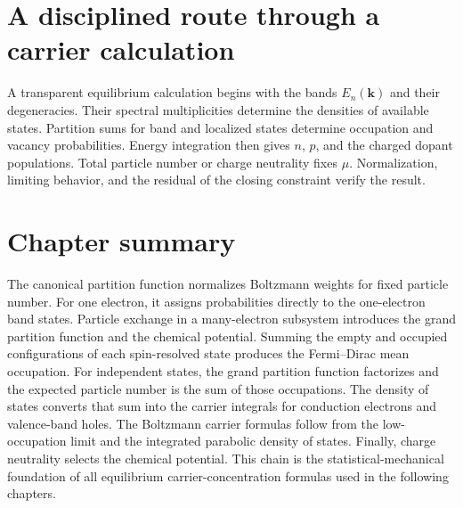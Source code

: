 \section{A disciplined route through a carrier calculation}

A transparent equilibrium calculation begins with the bands
$E_n(\bm k)$ and their degeneracies.  Their spectral multiplicities determine
the densities of available states.  Partition sums for band and localized
states determine occupation and vacancy probabilities.  Energy integration
then gives $n$, $p$, and the charged dopant populations.  Total particle number
or charge neutrality fixes $\mu$.  Normalization, limiting behavior, and the
residual of the closing constraint verify the result.

\section{Chapter summary}

The canonical partition function normalizes Boltzmann weights for fixed particle
number.  For one electron, it assigns probabilities directly to the
one-electron band states.  Particle exchange in a many-electron subsystem
introduces the grand partition
function and the chemical potential.  Summing the empty and occupied
configurations of each spin-resolved state produces the Fermi--Dirac mean
occupation.  For independent states,
the grand partition function factorizes and the expected particle number is the
sum of those occupations.  The density of states converts that sum into the
carrier integrals for conduction electrons and valence-band holes.  The
Boltzmann carrier formulas follow from the low-occupation limit and the
integrated parabolic density of states.  Finally, charge neutrality selects
the chemical potential.  This chain is the statistical-mechanical foundation of
all equilibrium carrier-concentration formulas used in the following chapters.
